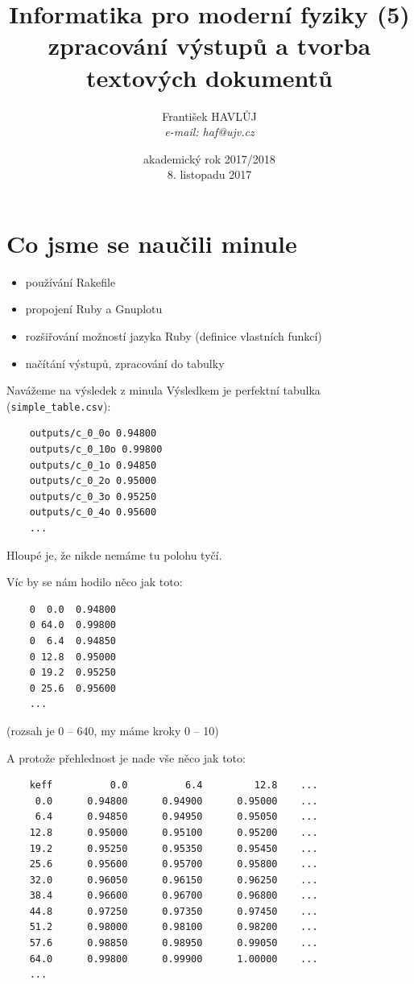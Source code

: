 \documentclass{beamer}
\title[IMF (5)]{Informatika pro moderní fyziky (5)\\zpracování výstupů a tvorba textových dokumentů}
\author[Franti\v{s}ek HAVL\r{U}J, ORF ÚJV Řež]{Franti\v{s}ek HAVL\r{U}J\\{\scriptsize \emph{e-mail: haf@ujv.cz}}}
\date{akademický rok 2017/2018\\8. listopadu 2017}
\institute[ORF ÚJV Řež]
{ÚJV Řež\\oddělení Reaktorové fyziky a podpory palivového cyklu}
\begin{document}
\begin{frame}
  \titlepage
\end{frame}

\begin{frame}
  \tableofcontents
\end{frame}

\section{Co jsme se naučili minule}

\begin{frame}{}
  \begin{itemize}
    \item používání Rakefile
    \item propojení Ruby a Gnuplotu
    \item rozšiřování možností jazyka Ruby (definice vlastních funkcí)
    \item načítání výstupů, zpracování do tabulky
  \end{itemize}
\end{frame}


\begin{frame}[fragile]{Navážeme na výsledek z minula}
  Výsledkem je perfektní tabulka (\texttt{simple\_table.csv}):
  {\scriptsize
  \begin{verbatim}
    outputs/c_0_0o 0.94800
    outputs/c_0_10o 0.99800
    outputs/c_0_1o 0.94850
    outputs/c_0_2o 0.95000
    outputs/c_0_3o 0.95250
    outputs/c_0_4o 0.95600
    ...
  \end{verbatim}}
  Hloupé je, že nikde nemáme tu polohu tyčí.
\end{frame}


\begin{frame}[fragile]{Víc by se nám hodilo}
  něco jak toto:
  {\scriptsize
  \begin{verbatim}
    0  0.0  0.94800
    0 64.0  0.99800
    0  6.4  0.94850
    0 12.8  0.95000
    0 19.2  0.95250
    0 25.6  0.95600
    ...
  \end{verbatim}
  }
  (rozsah je 0 -- 640, my máme kroky 0 -- 10)
\end{frame}


\begin{frame}[fragile]{A protože přehlednost je nade vše}
  něco jak toto:
  {\scriptsize
  \begin{verbatim}
    keff          0.0          6.4         12.8    ...
     0.0      0.94800      0.94900      0.95000    ...
     6.4      0.94850      0.94950      0.95050    ...
    12.8      0.95000      0.95100      0.95200    ...
    19.2      0.95250      0.95350      0.95450    ...
    25.6      0.95600      0.95700      0.95800    ...
    32.0      0.96050      0.96150      0.96250    ...
    38.4      0.96600      0.96700      0.96800    ...
    44.8      0.97250      0.97350      0.97450    ...
    51.2      0.98000      0.98100      0.98200    ...
    57.6      0.98850      0.98950      0.99050    ...
    64.0      0.99800      0.99900      1.00000    ...
    ...
  \end{verbatim}
  }
\end{frame}
\end{document}

